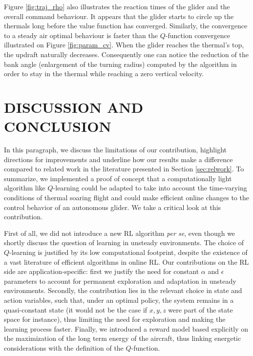 \documentclass{jfpda}
\begin{document}
Figure \ref{fig:traj_rho} also illustrates the reaction times of the glider and the overall command behaviour. It appears that the glider starts to circle up the thermals long before the value function has converged. Similarly, the convergence to a steady air optimal behaviour is faster than the $Q$-function convergence illustrated on Figure \ref{fig:param_cv}.
When the glider reaches the thermal's top, the updraft naturally decreases. Consequently one can notice the reduction of the bank angle (enlargement of the turning radius) computed by the algorithm in order to stay in the thermal while reaching a zero vertical velocity.


\section{DISCUSSION AND CONCLUSION}
\label{sec:conclu}

In this paragraph, we discuss the limitations of our contribution, highlight directions for improvements and underline how our results make a difference compared to related work in the literature presented in Section \ref{sec:relwork}. To summarize, we implemented a proof of concept that a computationally light algorithm like $Q$-learning could be adapted to take into account the time-varying conditions of thermal soaring flight and could make efficient online changes to the control behavior of an autonomous glider. We take a critical look at this contribution.

First of all, we did not introduce a new RL algorithm \emph{per se}, even though we shortly discuss the question of learning in unsteady environments. The choice of $Q$-learning is justified by its low computational footprint, despite the existence of a vast literature of efficient algorithms in online RL. Our contributions on the RL side are application-specific: first we justify the need for constant $\alpha$ and $\epsilon$ parameters to account for permanent exploration and adaptation in unsteady environments. Secondly, the contribution lies in the relevant choice in state and action variables, such that, under an optimal policy, the system remains in a quasi-constant state (it would not be the case if $x,y,z$ were part of the state space for instance), thus limiting the need for exploration and making the learning process faster. Finally, we introduced a reward model based explicitly on the maximization of the long term energy of the aircraft, thus linking energetic considerations with the definition of the $Q$-function.
\end{document}
